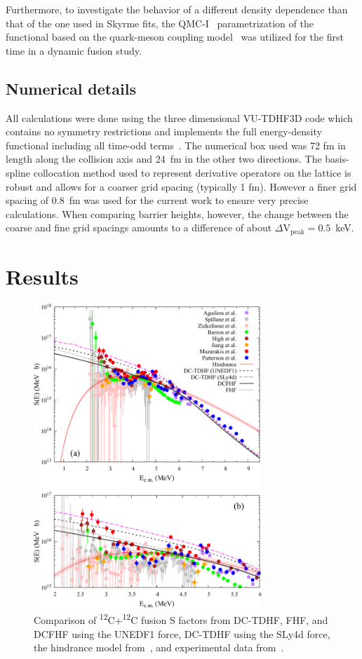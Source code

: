 Furthermore, to investigate the behavior of a different density dependence than that of the one used in Skyrme fits, the QMC-I~\protect\cite{stone2016} parametrization of the functional based on the quark-meson coupling model~\protect\cite{guichon1988,guichon1996} was utilized for the first time in a dynamic fusion study.

\subsection{Numerical details}

All calculations were done using the three dimensional VU-TDHF3D code which contains no symmetry restrictions and implements the full energy-density functional including all time-odd terms~\protect\cite{umar2006c}. 
The numerical box used was 72 fm in length along the collision axis and 24~fm in the other two directions.
The basis-spline collocation method used to represent derivative operators on the lattice is robust and allows for a coarser grid spacing (typically 1 fm).
However a finer grid spacing of 0.8~fm was used for the current work to ensure very precise calculations. 
When comparing barrier heights, however, the change between the coarse and fine grid spacings amounts to a difference of about $\Delta \mathrm{V}_{\mathrm{peak}}=0.5$~keV.

\section{Results}
\label{sec:res}

\begin{figure}
	\includegraphics*[width=8.6cm]{../Figures/SFactors.pdf}
	\caption{Comparison of \textsuperscript{12}C+\textsuperscript{12}C fusion S factors from DC-TDHF, FHF, and DCFHF using the UNEDF1 force, DC-TDHF using the SLy4d force, the hindrance model from~\protect\cite{jiang2007}, and experimental data from~\protect\cite{aguilera2006,spillane2007,zickefoose2011,barron-palos2006,high1977,jiang2018,mazarakis1973,patterson1969}. }
	\label{fig:sfac}
\end{figure}

